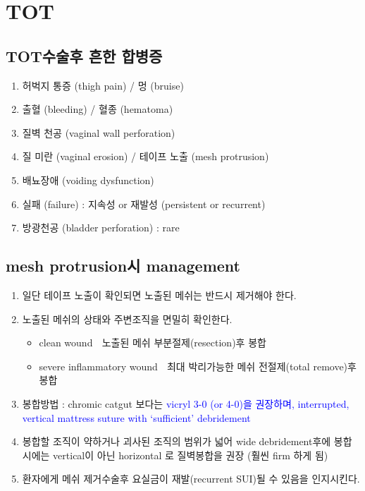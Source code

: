 \section{TOT}
\subsection{TOT수술후  흔한 합병증}
\begin{enumerate}\tightlist
\item 허벅지 통증 (thigh pain) / 멍 (bruise)
\item 출혈 (bleeding) / 혈종 (hematoma)
\item 질벽 천공 (vaginal  wall perforation)
\item 질 미란 (vaginal  erosion) / 테이프 노출 (mesh protrusion) 
\item 배뇨장애 (voiding dysfunction) 
\item 실패 (failure) : 지속성 or 재발성 (persistent  or  recurrent)
\item 방광천공 (bladder perforation) : rare
\end{enumerate}

\subsection{mesh protrusion시  management}
\begin{enumerate}\tightlist
\item 일단 테이프 노출이 확인되면 노출된 메쉬는 반드시 제거해야 한다. 
\item 노출된 메쉬의 상태와 주변조직을 면밀히 확인한다.
   \begin{itemize}\tightlist
   \item clean wound  노출된 메쉬 부분절제(resection)후 봉합   
   \item severe inflammatory wound  최대 박리가능한 메쉬 전절제(total remove)후 봉합
   \end{itemize} 
\item 봉합방법 : chromic catgut 보다는 \textcolor{blue}{vicryl 3-0 (or 4-0)을 권장하며, interrupted, vertical mattress suture with ‘sufficient’ debridement}
\item 봉합할 조직이 약하거나 괴사된 조직의 범위가 넓어 wide debridement후에 
   봉합시에는 vertical이 아닌 horizontal 로 질벽봉합을 권장 (훨씬 firm 하게 됨) 
\item 환자에게 메쉬 제거수술후 요실금이 재발(recurrent SUI)될 수 있음을 인지시킨다. 
\end{enumerate}

